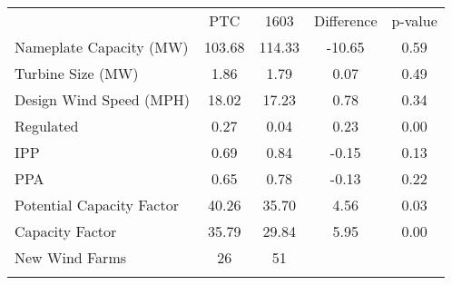 \begin{center}
\begin{tabular}{lcccc}
\hline \noalign{\smallskip} & PTC & 1603 & Difference & p-value\\
\noalign{\smallskip}\hline Nameplate Capacity (MW) & 103.68 & 114.33 & -10.65 & 0.59\\
Turbine Size (MW) & 1.86 & 1.79 & 0.07 & 0.49\\
Design Wind Speed (MPH) & 18.02 & 17.23 & 0.78 & 0.34\\
Regulated & 0.27 & 0.04 & 0.23 & 0.00\\
IPP & 0.69 & 0.84 & -0.15 & 0.13\\
PPA & 0.65 & 0.78 & -0.13 & 0.22\\
Potential Capacity Factor & 40.26 & 35.70 & 4.56 & 0.03\\
Capacity Factor & 35.79 & 29.84 & 5.95 & 0.00\\
\hline \noalign{\smallskip}New Wind Farms & 26 & 51 &  & \\
\noalign{\smallskip}\hline\end{tabular}\\
\end{center}

